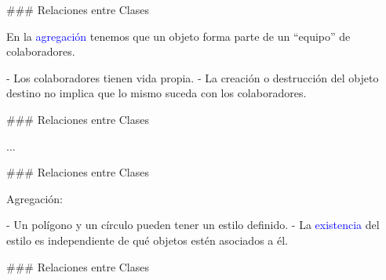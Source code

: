 ### Relaciones entre Clases

\newline

\columnsbegin


En la \textcolor{blue}{agregación} tenemos que un objeto forma parte
de un ``equipo'' de colaboradores.

- Los colaboradores tienen vida propia.
- La creación o destrucción del objeto destino no implica que lo mismo
suceda con los colaboradores.


\centering{}

\columnsend

### Relaciones entre Clases

\newline

\columnsbegin

...


\centering{}

\columnsend

### Relaciones entre Clases

\newline


\usebox{\umlAgregComp}\par

Agregación:

- Un polígono y un círculo pueden tener un estilo definido.
- La \textcolor{blue}{existencia} del estilo es independiente de
qué objetos estén asociados a él.

### Relaciones entre Clases

\newline

\usebox{\umlAgregComp}\par

